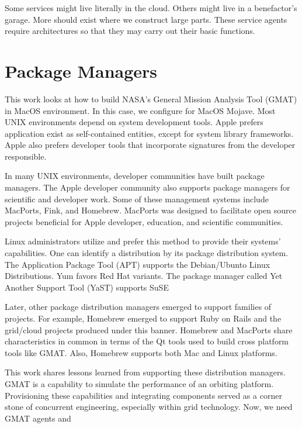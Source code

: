 \documentclass[
  a4paper, %
  11pt, %
  twoside,    %
  onecolumn,  %
  openright,  %
]{memoir}
\begin{document}
Some services might live literally in the cloud.  Others might live in a benefactor's garage. More should exist where we construct large parts. These service agents require architectures so that they may carry out their basic functions.

  

\section{Package Managers} %
\label{sec:package_managers}

This work looks at how to build NASA's General Mission Analysis Tool (GMAT) in MacOS environment.  In this case, we configure for MacOS Mojave.  %
Most UNIX environments depend on system development tools.  Apple prefers application exist as self-contained entities, except for system library frameworks.  Apple also prefers developer tools that incorporate signatures from the developer responsible.

In many UNIX environments, developer communities have built package managers.  The Apple developer community also supports package managers for scientific and developer work.  Some of these management systems include MacPorts, Fink, and Homebrew.  MacPorts was  designed to facilitate open source projects beneficial for Apple developer, education, and scientific communities. 

Linux administrators utilize and prefer this method to provide their systems' capabilities.  One can identify a distribution by its package distribution system.  The Application Package Tool (APT) supports the Debian/Ubunto Linux Distributions.   Yum favors Red Hat variants.  The package manager called Yet Another Support Tool (YaST) supports SuSE %

Later, other package distribution managers emerged to support families of projects.  For example, Homebrew emerged to support Ruby on Rails and the grid/cloud projects produced under this banner.  Homebrew and MacPorts share characteristics in common in terms of the Qt tools used to build cross platform tools like GMAT.  Also, Homebrew supports both Mac and Linux platforms.

This work shares lessons learned from supporting these distribution managers.  GMAT is a capability to simulate the performance of an orbiting platform.  Provisioning these capabilities and integrating components served as a corner stone of concurrent engineering, especially within grid technology.  Now, we need GMAT agents and 
\end{document}
